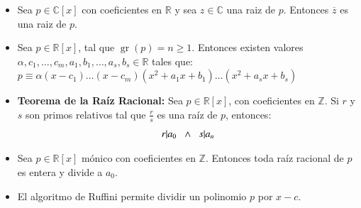 \documentclass[letterpaper,10pt]{article}
\newcommand{\R}{\mathbb R}
\newcommand{\Z}{\mathbb Z}
\newcommand{\C}{\mathbb C}
\DeclareMathOperator{\gr}{gr}
\theoremstyle{plain}
\begin{document}
	\begin{framed}
    \begin{multicols}{2}
    \begin{itemize}
		\item Sea $p \in \C[x]$ con coeficientes en $\R$ y sea $z \in \C$ una raiz de $p$. Entonces $\overline{z}$ es una raiz de $p$.
		\item Sea $p \in \R[x]$, tal que $\gr(p)=n\geq 1$. Entonces existen valores $\alpha, c_1, \dotso,c_m, a_1,b_1, \dotso , a_s,b_s \in \R$ tales que:\\
		$
		p\equiv\alpha (x-c_1)\dotso (x-c_m)(x^2+a_1x+b_1)\dotso (x^2
		+a_sx+b_s)
		$
		\item \textbf{Teorema de la Raíz Racional:} Sea $p \in \R[x]$, con coeficientes en $\Z$. Si $r$ y $s$ son primos relativos tal que $\frac{r}{s}$ es una raíz de $p$, entonces:
			$$
			r|a_0 \hspace{2 mm} \land \hspace{2 mm} s|a_n
			$$
		\item Sea $p \in \R[x]$ mónico con coeficientes en $\Z$. Entonces toda raíz racional de $p$ es entera y divide a $a_0$.
		\item El algoritmo de Ruffini permite dividir un polinomio $p$ por $x-c$.        
    \end{itemize}
    \end{multicols}
\end{framed}
\end{document}
